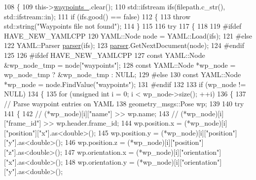\begin{DoxyCode}
108 \{
109   this->\hyperlink{classcl__move__base__z_1_1WaypointNavigator_a727f6a73e15ff5dc6bb3ffdf52c3d832}{waypoints\_}.clear();
110   std::ifstream ifs(filepath.c\_str(), std::ifstream::in);
111   \textcolor{keywordflow}{if} (ifs.good() == \textcolor{keyword}{false})
112   \{
113     \textcolor{keywordflow}{throw} std::string(\textcolor{stringliteral}{"Waypoints file not found"});
114   \}
115 
116   \textcolor{keywordflow}{try}
117   \{
118 
119 \textcolor{preprocessor}{#ifdef HAVE\_NEW\_YAMLCPP}
120     YAML::Node node = YAML::Load(ifs);
121 \textcolor{preprocessor}{#else}
122     YAML::Parser \hyperlink{namespacegenerate__debs_a4a9ae4bb85fc62d7973ea3d09ced6c26}{parser}(ifs);
123     \hyperlink{namespacegenerate__debs_a4a9ae4bb85fc62d7973ea3d09ced6c26}{parser}.GetNextDocument(node);
124 \textcolor{preprocessor}{#endif}
125 
126 \textcolor{preprocessor}{#ifdef HAVE\_NEW\_YAMLCPP}
127     \textcolor{keyword}{const} YAML::Node &wp\_node\_tmp = node[\textcolor{stringliteral}{"waypoints"}];
128     \textcolor{keyword}{const} YAML::Node *wp\_node = wp\_node\_tmp ? &wp\_node\_tmp : NULL;
129 \textcolor{preprocessor}{#else}
130     \textcolor{keyword}{const} YAML::Node *wp\_node = node.FindValue(\textcolor{stringliteral}{"waypoints"});
131 \textcolor{preprocessor}{#endif}
132 
133     \textcolor{keywordflow}{if} (wp\_node != NULL)
134     \{
135       \textcolor{keywordflow}{for} (\textcolor{keywordtype}{unsigned} \textcolor{keywordtype}{int} i = 0; i < wp\_node->size(); ++i)
136       \{
137         \textcolor{comment}{// Parse waypoint entries on YAML}
138         geometry\_msgs::Pose wp;
139 
140         \textcolor{keywordflow}{try}
141         \{
142           \textcolor{comment}{// (*wp\_node)[i]["name"] >> wp.name;}
143           \textcolor{comment}{// (*wp\_node)[i]["frame\_id"] >> wp.header.frame\_id;}
144           wp.position.x = (*wp\_node)[i][\textcolor{stringliteral}{"position"}][\textcolor{stringliteral}{"x"}].as<\textcolor{keywordtype}{double}>();
145           wp.position.y = (*wp\_node)[i][\textcolor{stringliteral}{"position"}][\textcolor{stringliteral}{"y"}].as<\textcolor{keywordtype}{double}>();
146           wp.position.z = (*wp\_node)[i][\textcolor{stringliteral}{"position"}][\textcolor{stringliteral}{"z"}].as<\textcolor{keywordtype}{double}>();
147           wp.orientation.x = (*wp\_node)[i][\textcolor{stringliteral}{"orientation"}][\textcolor{stringliteral}{"x"}].as<\textcolor{keywordtype}{double}>();
148           wp.orientation.y = (*wp\_node)[i][\textcolor{stringliteral}{"orientation"}][\textcolor{stringliteral}{"y"}].as<\textcolor{keywordtype}{double}>();

\end{DoxyCode}
